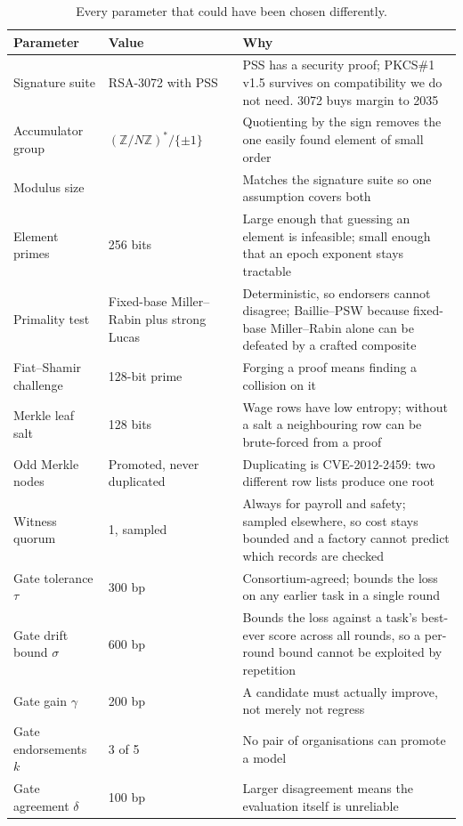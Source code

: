 \begin{table}[htbp]
\centering
\caption{Every parameter that could have been chosen differently.}
\label{tab:params}
\small
\begin{tabularx}{\textwidth}{@{}l l Y@{}}
\toprule
\textbf{Parameter} & \textbf{Value} & \textbf{Why} \\
\midrule
Signature suite & RSA-3072 with PSS & PSS has a security proof; PKCS\#1 v1.5 survives on compatibility we do not need. 3072 buys margin to 2035 \citep{nist2024ir8547} \\
Accumulator group & $(\mathbb{Z}/N\mathbb{Z})^{*}/\{\pm1\}$ & Quotienting by the sign removes the one easily found element of small order \\
Modulus size &  & Matches the signature suite so one assumption covers both \\
Element primes & 256 bits & Large enough that guessing an element is infeasible; small enough that an epoch exponent stays tractable \\
Primality test & Fixed-base Miller--Rabin plus strong Lucas & Deterministic, so endorsers cannot disagree; Baillie--PSW because fixed-base Miller--Rabin alone can be defeated by a crafted composite \\
Fiat--Shamir challenge & 128-bit prime & Forging a proof means finding a collision on it \\
Merkle leaf salt & 128 bits & Wage rows have low entropy; without a salt a neighbouring row can be brute-forced from a proof \\
Odd Merkle nodes & Promoted, never duplicated & Duplicating is CVE-2012-2459: two different row lists produce one root \\
Witness quorum & 1, sampled & Always for payroll and safety; sampled elsewhere, so cost stays bounded and a factory cannot predict which records are checked \\
Gate tolerance $\tau$ & 300 bp & Consortium-agreed; bounds the loss on any earlier task in a single round \\
Gate drift bound $\sigma$ & 600 bp & Bounds the loss against a task's best-ever score across all rounds, so a per-round bound cannot be exploited by repetition \\
Gate gain $\gamma$ & 200 bp & A candidate must actually improve, not merely not regress \\
Gate endorsements $k$ & 3 of 5 & No pair of organisations can promote a model \\
Gate agreement $\delta$ & 100 bp & Larger disagreement means the evaluation itself is unreliable \\
\bottomrule
\end{tabularx}
\end{table}

